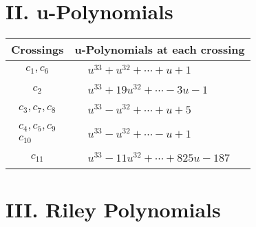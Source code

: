 \documentclass[1p]{elsarticle_modified}
\theoremstyle{definition}
\begin{document}
\newpage\renewcommand{\arraystretch}{1}
\centering \section*{ II. u-Polynomials}
\begin{tabular}{m{50pt}|m{274pt}}
Crossings & \hspace{64pt}u-Polynomials at each crossing \\
\hline $$\begin{aligned}c_{1},c_{6}\end{aligned}$$&$\begin{aligned}
&u^{33}+u^{32}+\cdots+u+1
\end{aligned}$\\
\hline $$\begin{aligned}c_{2}\end{aligned}$$&$\begin{aligned}
&u^{33}+19 u^{32}+\cdots-3 u-1
\end{aligned}$\\
\hline $$\begin{aligned}c_{3},c_{7},c_{8}\end{aligned}$$&$\begin{aligned}
&u^{33}- u^{32}+\cdots+u+5
\end{aligned}$\\
\hline $$\begin{aligned}c_{4},c_{5},c_{9}\\c_{10}\end{aligned}$$&$\begin{aligned}
&u^{33}- u^{32}+\cdots- u+1
\end{aligned}$\\
\hline $$\begin{aligned}c_{11}\end{aligned}$$&$\begin{aligned}
&u^{33}-11 u^{32}+\cdots+825 u-187
\end{aligned}$\\
\hline
\end{tabular}\newpage\renewcommand{\arraystretch}{1}
\centering \section*{ III. Riley Polynomials}
\end{document}

